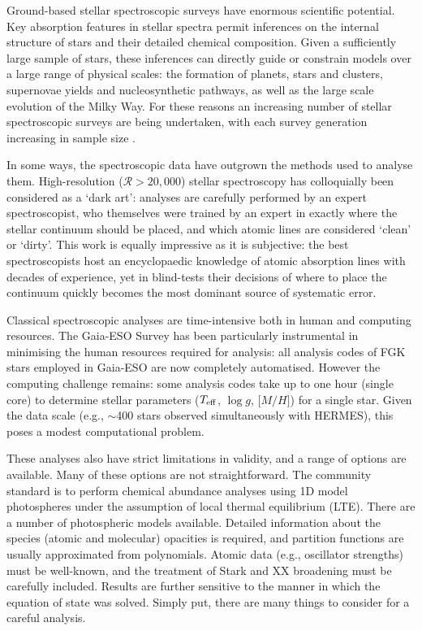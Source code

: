 \documentclass[useAMS,usenatbib]{mn2e}
\newcommand\teff{$T_{\rm eff}$}
\newcommand\logg{$\log{g}$}
\newcommand\mh{${\mathrm [M/H]}$}
\begin{document}
Ground-based stellar spectroscopic surveys have enormous scientific potential.
  Key absorption features in stellar spectra permit inferences on the internal 
structure of stars and their detailed chemical composition.  Given a sufficiently
large sample of stars, these inferences can directly guide or constrain models 
over a large range of physical scales: the formation of planets, stars and 
clusters, supernovae yields and nucleosynthetic pathways, as well as the large 
scale evolution of the Milky Way.  For these reasons an increasing number of 
stellar spectroscopic surveys are being undertaken, with each survey generation 
increasing in sample size \citep{gaia_eso; galah; lamost; apogee; 4most}.

In some ways, the spectroscopic data have outgrown the methods used to analyse
them. High-resolution ($\mathcal{R} > 20,000$) stellar spectroscopy has 
colloquially been considered as a `dark art': analyses are carefully performed 
by an expert spectroscopist, who themselves were trained by an expert in exactly
where the stellar continuum should be placed, and which atomic lines are 
considered `clean' or `dirty'. This work is equally impressive as it is 
subjective: the best spectroscopists host an encyclopaedic knowledge of atomic
absorption lines with decades of experience, yet in blind-tests their decisions 
of where to place the continuum quickly becomes the most dominant source of 
systematic error.

Classical spectroscopic analyses are time-intensive both in human and computing
resources. The Gaia-ESO Survey has been particularly instrumental in minimising
the human resources required for analysis: all analysis codes of FGK stars 
employed in Gaia-ESO are now completely automatised.  However the computing
challenge remains: some analysis codes take up to one hour (single core) to 
determine stellar parameters (\teff, \logg, \mh) for a single star. Given the 
data scale (e.g., $\sim$400 stars observed simultaneously with HERMES), this 
poses a modest computational problem.

These analyses also have strict limitations in validity, and a range of options
are available.  Many of these options are not straightforward.  The community 
standard is to perform chemical abundance analyses using 1D model photospheres 
under the assumption of local thermal equilibrium (LTE). There are a number of 
photospheric models available.  Detailed information about the species (atomic 
and molecular) opacities is required, and partition functions are usually 
approximated from polynomials. Atomic data (e.g., oscillator strengths) must be
well-known, and the treatment of Stark and XX broadening must be carefully
included. Results are further sensitive to the manner in which the equation of 
state was solved. Simply put, there are many things to consider for a careful 
analysis.
\end{document}
